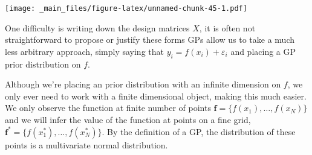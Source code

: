 \documentclass[
]{book}
\theoremstyle{definition}
\theoremstyle{definition}
\theoremstyle{definition}
\theoremstyle{definition}
\theoremstyle{remark}
\begin{document}
\texttt{[image: \_main\_files/figure-latex/unnamed-chunk-45-1.pdf]}

One difficulty is writing down the design matrices \(X\), it is often not straightforward to propose or justify these forms GPs allow us to take a much less arbitrary approach, simply saying that \(y_i = f(x_i) + \varepsilon_i\) and placing a GP prior distribution on \(f\).

Although we're placing an prior distribution with an infinite dimension on \(f\), we only ever need to work with a finite dimensional object, making this much easier. We only observe the function at finite number of points \(\boldsymbol{f} = \{f(x_1), \ldots, f(x_N)\}\) and we will infer the value of the function at points on a fine grid, \(\boldsymbol{f}^* = \{f(x_1^*), \ldots, f(x_N^*)\}\). By the definition of a GP, the distribution of these points is a multivariate normal distribution.
\end{document}
